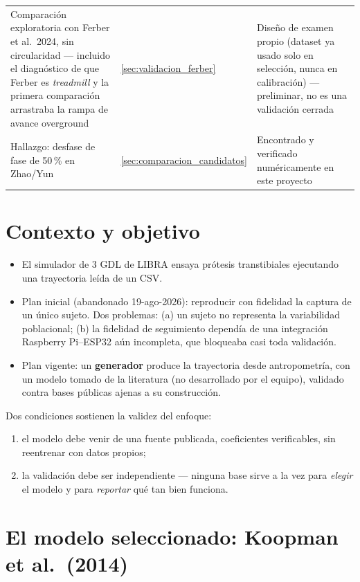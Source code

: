 \documentclass[11pt,a4paper]{scrartcl}
\begin{document}
\begin{table}[H]
\begin{tabular}{@{}p{4.6cm}p{1.6cm}p{7.4cm}@{}}
Comparación exploratoria con Ferber et al.\ 2024, sin circularidad --- incluido el diagnóstico de que Ferber es \emph{treadmill} y la primera comparación arrastraba la rampa de avance overground & \ref{sec:validacion_ferber} & Diseño de examen propio (dataset ya usado solo en selección, nunca en calibración) --- preliminar, no es una validación cerrada \\
Hallazgo: desfase de fase de 50\,\% en Zhao/Yun & \ref{sec:comparacion_candidatos} & Encontrado y verificado numéricamente en este proyecto \\
\bottomrule
\end{tabular}
\end{table}

\section{Contexto y objetivo}
\label{sec:contexto}

\begin{itemize}
    \item El simulador de 3 GDL de LIBRA ensaya prótesis transtibiales ejecutando una trayectoria leída de un CSV.
    \item Plan inicial (abandonado 19-ago-2026): reproducir con fidelidad la captura de un único sujeto. Dos problemas: (a) un sujeto no representa la variabilidad poblacional; (b) la fidelidad de seguimiento dependía de una integración Raspberry Pi--ESP32 aún incompleta, que bloqueaba casi toda validación.
    \item Plan vigente: un \textbf{generador} produce la trayectoria desde antropometría, con un modelo tomado de la literatura (no desarrollado por el equipo), validado contra bases públicas ajenas a su construcción.
\end{itemize}

Dos condiciones sostienen la validez del enfoque:
\begin{enumerate}
    \item el modelo debe venir de una fuente publicada, coeficientes verificables, sin reentrenar con datos propios;
    \item la validación debe ser independiente --- ninguna base sirve a la vez para \emph{elegir} el modelo y para \emph{reportar} qué tan bien funciona.
\end{enumerate}

\section{El modelo seleccionado: Koopman et al.\ (2014)}
\label{sec:koopman}
\end{document}
